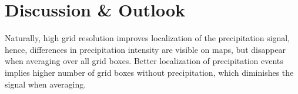 \section{Discussion \& Outlook}

Naturally, high grid resolution improves localization of the precipitation signal, hence, differences in precipitation intensity are visible on maps, but disappear when averaging over all grid boxes. Better localization of precipitation events implies higher number of grid boxes without precipitation, which diminishes the signal when averaging. 

